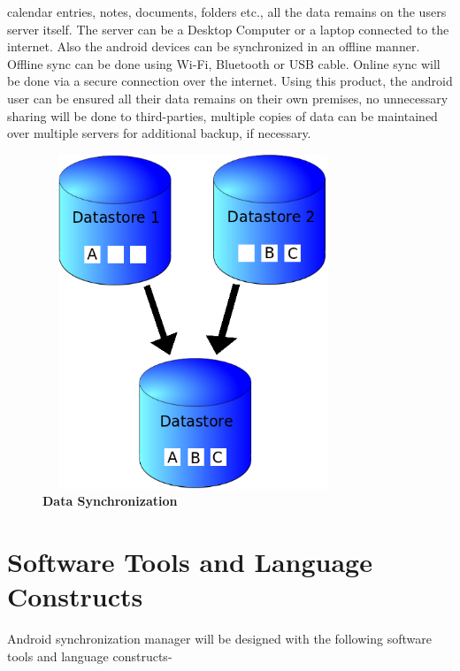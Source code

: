 calendar entries, notes, documents, folders etc., all the data remains on the users server itself.
The server can be a Desktop Computer or a laptop connected to the internet. Also the android
devices can be synchronized in an offline manner.\\[0.5cm]
\hspace*{0.82cm}Offline sync can be done using Wi-Fi, Bluetooth or USB cable. Online sync will be
done via a secure connection over the internet. Using this product, the android user can be
ensured all their data remains on their own premises, no unnecessary sharing will be done to
third-parties, multiple copies of data can be maintained over multiple servers for additional
backup, if necessary.\\[0.3cm]

\begin{figure}[H]
  \centering
    \includegraphics[height= 10cm, width=9cm]{project/images/data-sync}
  \caption{\textbf{Data Synchronization}}
\end{figure}

\section{Software Tools and Language Constructs}
\hspace*{0.82cm}Android synchronization manager will be designed with the following software tools and 
language constructs-
